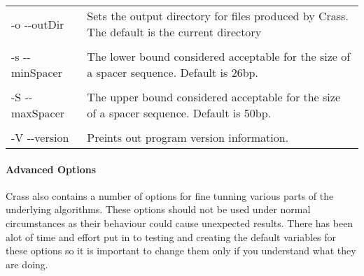 \documentclass[11pt]{article} %
\begin{document}
\begin{longtable}{  l   p{10cm} }
-o -{}-outDir & Sets the output directory for files produced by Crass.  The default is the current directory\\ \\
-s -{}-minSpacer & The lower bound considered acceptable for the size of a spacer sequence. Default is 26bp.\\ \\
-S -{}-maxSpacer & The upper bound considered acceptable for the size of a spacer sequence. Default is 50bp.\\ \\
-V -{}-version & Preints out program version information. \\
    \hline
 \end{longtable}
\paragraph{Advanced Options}
Crass also contains a number of options for fine tunning various parts of the underlying algorithms.  These options should not be used under normal circumstances as their behaviour could cause unexpected results.  There has been alot of time and effort put in to testing and creating the default variables for these options so it is important to change them only if you understand what they are doing.
\end{document}
